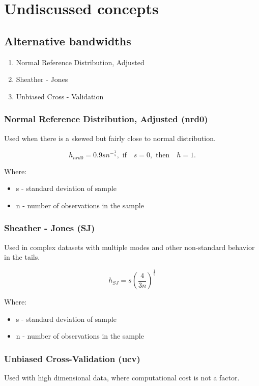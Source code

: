 \documentclass[]{article}
\begin{document}
	
	\section{Undiscussed concepts}
	
	\subsection{Alternative bandwidths}
	
	\begin{enumerate}
		\item Normal Reference Distribution, Adjusted
		\item Sheather - Jones
		\item Unbiased Cross - Validation
	\end{enumerate} 
	
	\subsubsection{Normal Reference Distribution, Adjusted (nrd0)}
	 Used when there is a skewed but fairly close to normal distribution.
	 
	 $$ h_{nrd0} = 0.9 sn^{-\frac{1}{5}}, \text{ if} \quad s = 0, \text{ then} \quad h = 1. $$
	 
	 Where:
	 \begin{itemize}
	 	\item [] s - standard deviation of sample
	 	\item [] n - number of observations in the sample
	 \end{itemize}
	 
	\subsubsection{Sheather - Jones (SJ)}
	Used in complex datasets with multiple modes and other non-standard behavior in the tails.
	
	$$ h_{SJ} = s \left( \frac{4}{3n} \right)^{\frac{1}{5}} $$
	
	Where:
	\begin{itemize}
		\item [] s - standard deviation of sample
		\item [] n - number of observations in the sample
	\end{itemize}
	
	\subsubsection{Unbiased Cross-Validation (ucv)}
	Used with high dimensional data, where computational cost is not a factor.	
	
\end{document}
